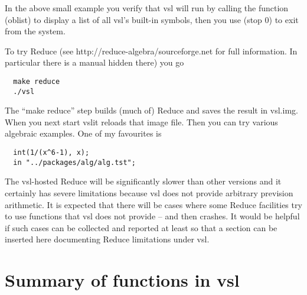 \documentclass[a4paper,12pt]{article}
\newcommand{\vsl}{{\ttfamily vsl}}
\newcommand{\tx}{\ttfamily}
\newcommand{\sverb}{\small\begin{verbatim}}
\begin{document}
In the above small example you verify that \vsl{} will run by calling the
function {\tx (oblist)} to display a list of all \vsl's built-in
symbols, then you use {\tx (stop 0)} to exit from the system.

To try Reduce (see {\tx http://reduce-algebra/sourceforge.net} for
full information. In particular there is a manual hidden there) you go
{\sverb
  make reduce
  ./vsl
\end{verbatim}}

The ``{\tx make reduce}'' step builds (much of) Reduce and saves
the result in {\tx vsl.img}. When you next start \vsl it reloads that
image file. Then you can try various algebraic examples. One of my
favourites is
{\sverb
  int(1/(x^6-1), x);
  in "../packages/alg/alg.tst";
\end{verbatim}}

The \vsl-hosted Reduce will be significantly slower than other versions
and it certainly has severe limitations because \vsl{} does not provide
arbitrary prevision arithmetic. It is expected that there will be cases
where some Reduce facilities try to use functions that \vsl{} does not
provide -- and then crashes. It would be helpful if such cases can be
collected and reported at least so that a section can be inserted here
documenting Reduce limitations under \vsl.


\section{Summary of functions in \vsl}




\end{document}
